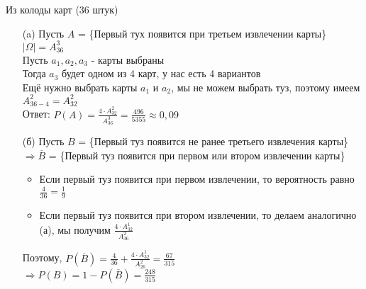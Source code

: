 \begin{exercise}[7] Из колоды карт (36 штук)
	\begin{enumerate}
		\item [(a)] Пусть $A$ = \{Первый тух появится при третьем извлечении карты\} \\ $| \Omega | = A^3_36$ \\ Пусть $a_1, a_2, a_3$ - карты выбраны \\ Тогда $a_3$ будет одном из 4 карт, у нас есть 4 вариантов \\ Ещё нужно выбрать карты $a_1$ и $a_2$, мы не можем выбрать туз, поэтому имеем $A^2_{36-4} = A^2_{32}$ \\ Ответ: $P(A) = \frac{4 \cdot A^2_{32}}{A^3_{36}} = \frac{496}{5355} \approx 0,09$
		\item [(б)] Пусть $B$ = \{Первый туз появится не ранее третьего извлечения карты\} \\ $\Rightarrow \overline{B}$ = \{Первый туз появится при первом или втором извлечении карты\}
		\begin{itemize}
			\item Если первый туз появится при первом извлечении, то вероятность равно $\frac{4}{36} = \frac{1}{9}$
			\item Если первый туз появится при втором извлечении, то делаем аналогично (а), мы получим $\frac{4 \cdot A^1_{32}}{A^2_{36}}$
		\end{itemize}
		Поэтому, $P(\overline{B}) = \frac{4}{36} + \frac{4 \cdot A^1_{32}}{A^2_{26}} = \frac{67}{315}$ \\ $\Rightarrow P(B) = 1 - P(\overline{B}) = \frac{248}{315}$
	\end{enumerate}
\end{exercise}

